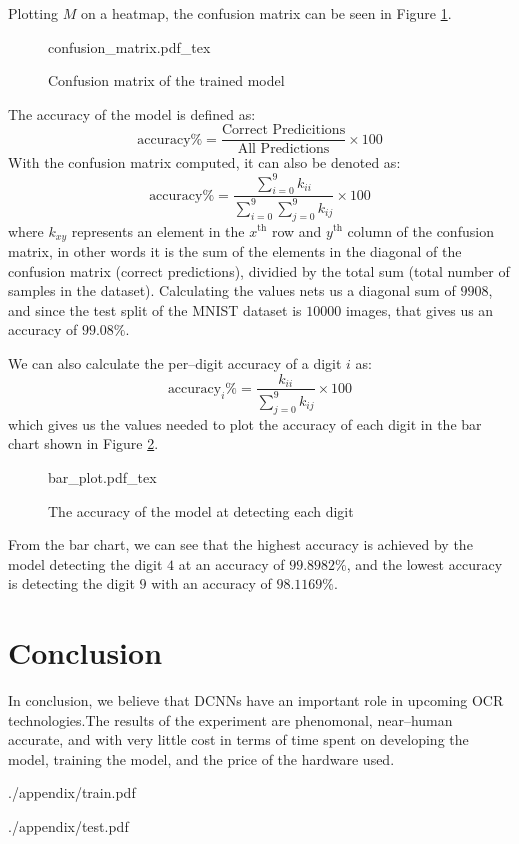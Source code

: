 \documentclass[conference]{IEEEtran}
\begin{document}
Plotting $M$ on a heatmap, the confusion matrix can be seen in Figure \ref{fig:confusion_matrix}.
\begin{figure}[!htp]
    \centering
    \def\svgwidth{\columnwidth}
    \scriptsize
    {confusion_matrix.pdf_tex}
    \caption{Confusion matrix of the trained model}\label{fig:confusion_matrix}
\end{figure}
\par The accuracy of the model is defined as:
\begin{equation}
    \text{accuracy\%}=\frac{\text{Correct Predicitions}}{\text{All Predictions}} \times 100
\end{equation}
With the confusion matrix computed, it can also be denoted as:
\begin{equation}
    \text{accuracy\%} = \frac{\sum_{i = 0}^9 k_{ii}}{\sum_{i = 0}^9 \sum_{j = 0}^9 k_{ij}} \times 100
\end{equation}
where $k_{xy}$ represents an element in the $x^\text{th}$ row and $y^\text{th}$ column of the confusion matrix, in other words it is the sum of the elements in the diagonal of the confusion matrix (correct predictions), dividied by the total sum (total number of samples in the dataset). Calculating the values nets us a diagonal sum of $9908$, and since the test split of the MNIST dataset is $10000$ images, that gives us an accuracy of $99.08\%$.
\par
We can also calculate the per--digit accuracy of a digit $i$ as:
\begin{equation}
    \text{accuracy}_{i}\% = \frac{k_{ii}}{\sum_{j = 0}^9 k_{ij}} \times 100
\end{equation}
which gives us the values needed to plot the accuracy of each digit in the bar chart shown in Figure \ref{fig:bar}.
\begin{figure}[!htp]
    \centering
    \def\svgwidth{\columnwidth}
    {bar_plot.pdf_tex}
    \caption{The accuracy of the model at detecting each digit}\label{fig:bar}
\end{figure}
\par From the bar chart, we can see that the highest accuracy is achieved by the model detecting the digit $4$ at an accuracy of $99.8982\%$, and the lowest accuracy is detecting the digit $9$ with an accuracy of $98.1169\%$.
\section{Conclusion}
In conclusion, we believe that DCNNs have an important role in upcoming OCR technologies.\@ The results of the experiment are phenomonal, near--human accurate, and with very little cost in terms of time spent on developing the model, training the model, and the price of the hardware used.\@




\onecolumn


    {./appendix/train.pdf}

    {./appendix/test.pdf}
\end{document}

